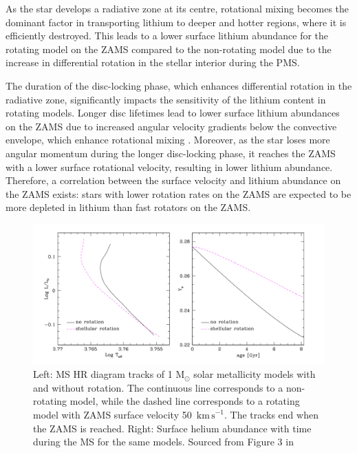 As the star develops a radiative zone at its centre, rotational mixing becomes the dominant factor in transporting lithium to deeper and hotter regions, where it is efficiently destroyed. 
This leads to a lower surface lithium abundance for the rotating model on the ZAMS compared to the non-rotating model due to the increase in differential rotation in the stellar interior during the PMS.

The duration of the disc-locking phase, which enhances differential rotation in the radiative zone, significantly impacts the sensitivity of the lithium content in rotating models. 
Longer disc lifetimes lead to lower surface lithium abundances on the ZAMS due to increased angular velocity gradients below the convective envelope, which enhance rotational mixing \citep{eggenberger_angular_2012}.
Moreover, as the star loses more angular momentum during the longer disc-locking phase, it reaches the ZAMS with a lower surface rotational velocity, resulting in lower lithium abundance.
Therefore, a correlation between the surface velocity and lithium abundance on the ZAMS exists: stars with lower rotation rates on the ZAMS are expected to be more depleted in lithium than fast rotators on the ZAMS.

\begin{figure}[h]
    \includegraphics[width=\textwidth]{Figures/intro_figures/MS_effect.png}
    \caption[Effect of rotation of main-sequence evoltuon of a stars 1 $M_{\odot}$]{Left: MS HR diagram tracks of 1 M$_{\odot}$ solar metallicity models with and without rotation. The continuous line corresponds to a non-rotating model, while the dashed line corresponds to a rotating model with ZAMS surface velocity 50 $\,\mathrm{km\,s}^{-1}$. The tracks end when the ZAMS is reached. Right: Surface helium abundance with time during the MS for the same models. Sourced from Figure 3 in \citet{eggenberger_rotation_2013}}
    \label{fig:ms_effect}
\end{figure}

